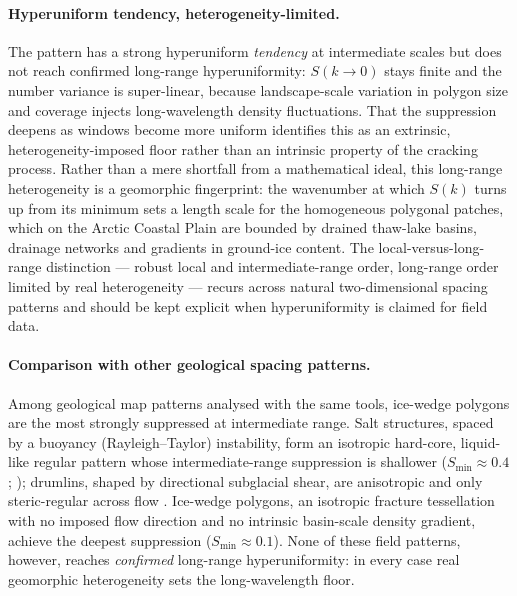 \documentclass[11pt]{article}
\begin{document}
\paragraph{Hyperuniform tendency, heterogeneity-limited.}
The pattern has a strong hyperuniform \emph{tendency} at intermediate scales but does not reach
confirmed long-range hyperuniformity: $S(k\!\to\!0)$ stays finite and the number variance is
super-linear, because landscape-scale variation in polygon size and coverage injects
long-wavelength density fluctuations. That the suppression deepens as windows become more uniform
identifies this as an extrinsic, heterogeneity-imposed floor rather than an intrinsic property of
the cracking process. Rather than a mere shortfall from a mathematical ideal, this long-range
heterogeneity is a geomorphic fingerprint: the wavenumber at which $S(k)$ turns up from its minimum
sets a length scale for the homogeneous polygonal patches, which on the Arctic Coastal Plain are
bounded by drained thaw-lake basins, drainage networks and gradients in ground-ice content. The
local-versus-long-range distinction --- robust local and
intermediate-range order, long-range order limited by real heterogeneity --- recurs across natural
two-dimensional spacing patterns and should be kept explicit when hyperuniformity is claimed for
field data.

\paragraph{Comparison with other geological spacing patterns.}
Among geological map patterns analysed with the same tools, ice-wedge polygons are the most
strongly suppressed at intermediate range. Salt structures, spaced by a buoyancy
(Rayleigh--Taylor) instability, form an isotropic hard-core, liquid-like regular pattern whose
intermediate-range suppression is shallower ($S_{\min}\!\approx\!0.4$;
\citealp{chen2026salt}); drumlins, shaped by directional subglacial shear, are anisotropic and
only steric-regular across flow \citep{chen2026drumlin}. Ice-wedge polygons, an isotropic
fracture tessellation with no imposed flow direction and no intrinsic basin-scale density
gradient, achieve the deepest suppression ($S_{\min}\!\approx\!0.1$). None of these field
patterns, however, reaches \emph{confirmed} long-range hyperuniformity: in every case real
geomorphic heterogeneity sets the long-wavelength floor.
\end{document}
